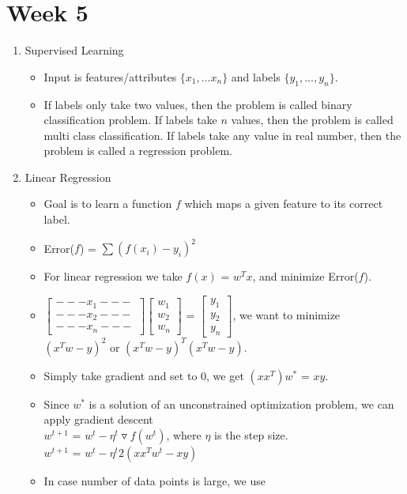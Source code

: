 \documentclass[a4paper]{article}
\begin{document}
\section{Week 5}
\begin{enumerate}
    \item Supervised Learning
    \begin{itemize}
        \item Input is features/attributes $\{x_1,...x_n\}$ and labels $\{y_1,...,y_n\}$.
        \item If labels only take two values, then the problem is called binary classification problem. If labels take $n$ values, then the problem is called multi class classification. If labels take any value in real number, then the problem is called a regression problem.
    \end{itemize}
    \item Linear Regression
    \begin{itemize}
        \item Goal is to learn a function $f$ which maps a given feature to its correct label.
        \item Error($f$) = $\sum(f(x_i) - y_i)^2$
        \item For linear regression we take $f(x)$ = $w^Tx$, and minimize Error($f$).
        \item $\begin{bmatrix}---x_1---\\---x_2---\\---x_n---\end{bmatrix}\begin{bmatrix}w_1\\w_2\\w_n\end{bmatrix}$ = $\begin{bmatrix}y_1\\y_2\\y_n\end{bmatrix}$, we want to minimize $(x^Tw - y)^2$ or $(x^Tw-y)^T(x^Tw-y)$.
        \item Simply take gradient and set to $0$, we get $(xx^T)w^*$ = $xy$.
        \item Since $w^*$ is a solution of an unconstrained optimization problem, we can apply gradient descent \\
        $w^{t+1}$ = $w^t - \eta^t \triangledown f(w^t)$, where $\eta$ is the step size.\\
        $w^{t+1}$ = $w^t - \eta^t 2(xx^Tw^t - xy)$
        \item In case number of data points is large, we use\\

\end{itemize}
\end{enumerate}
\end{document}

